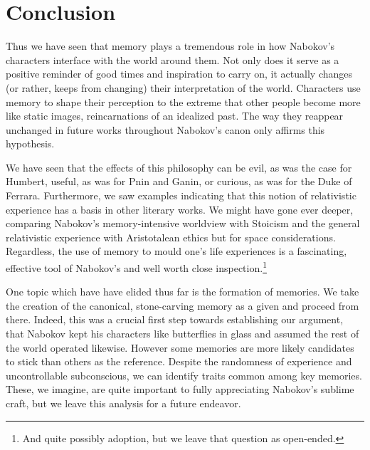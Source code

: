 \section{Conclusion}
\label{conclusion}
Thus we have seen that memory plays a tremendous role in how Nabokov's characters interface with the world around them. 
Not only does it serve as a positive reminder of good times and inspiration to carry on, it actually changes (or rather, keeps from changing) their interpretation of the world.
Characters use memory to shape their perception to the extreme that other people become more like static images, reincarnations of an idealized past.
The way they reappear unchanged in future works throughout Nabokov's canon only affirms this hypothesis.

We have seen that the effects of this philosophy can be evil, as was the case for Humbert, useful, as was for Pnin and Ganin, or curious, as was for the Duke of Ferrara.
Furthermore, we saw examples indicating that this notion of relativistic experience has a basis in other literary works. 
We might have gone ever deeper, comparing Nabokov's memory-intensive worldview with Stoicism and the general relativistic experience with Aristotalean ethics but for space considerations.
Regardless, the use of memory to mould one's life experiences is a fascinating, effective tool of Nabokov's and well worth close inspection.\footnote{And quite possibly adoption, but we leave that question as open-ended.}

One topic which have have elided thus far is the formation of memories.
We take the creation of the canonical, stone-carving memory as a given and proceed from there. 
Indeed, this was a crucial first step towards establishing our argument, that Nabokov kept his characters like butterflies in glass and assumed the rest of the world operated likewise.
However some memories are more likely candidates to stick than others as the reference.
Despite the randomness of experience and uncontrollable subconscious, we can identify traits common among key memories.
These, we imagine, are quite important to fully appreciating Nabokov's sublime craft, but we leave this analysis for a future endeavor.


